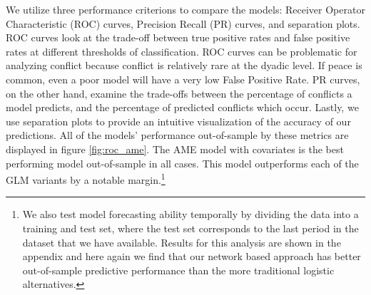 We utilize three performance criterions to compare the models: Receiver Operator Characteristic (ROC) curves, Precision Recall (PR) curves, and separation plots. ROC curves look at the trade-off between true positive rates and false positive rates at different thresholds of classification. ROC curves can be problematic for analyzing conflict because conflict is relatively rare at the dyadic level. If peace is common, even a poor model will have a very low False Positive Rate. PR curves, on the other hand, examine the trade-offs between the percentage of conflicts a model predicts, and the percentage of predicted conflicts which occur. Lastly, we use separation plots to provide an intuitive visualization of the accuracy of our predictions. All of the models' performance out-of-sample by these metrics are displayed in figure \ref{fig:roc_ame}. The AME model with covariates is the best performing model out-of-sample in all cases. This model outperforms each of the GLM variants by a notable margin.\footnote{We also test model forecasting ability temporally by dividing the data into a training and test set, where the test set corresponds to the last period in the dataset that we have available. Results for this analysis are shown in the appendix and here again we find that our network based approach has better out-of-sample predictive performance than the more traditional logistic alternatives.}

\FloatBarrier